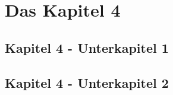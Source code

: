 
\chapter{Das Kapitel 4}
\label{Kapitel 4}
%


\section{Kapitel 4 - Unterkapitel 1}
\label{Kapitel_4_-_Unterkapitel_1}
%





\section{Kapitel 4 - Unterkapitel 2}
\label{Kapitel_4_-_Unterkapitel_2}
%

